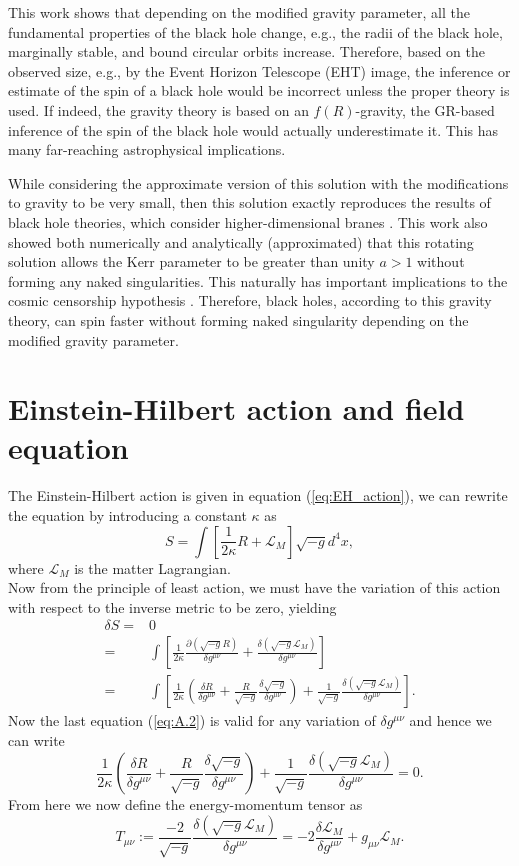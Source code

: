 \documentclass[12pt,a4paper,oneside]{book}
\newcommand{\eq}[2]{\begin{equation} \label{eq:#1} #2 \end{equation}}
\newcommand{\aeq}[2]{\begin{align} \label{eq:#1} #2 \end{align}}
\newcommand{\Eref}[1]{(\ref{eq:#1})}
\begin{document}
This work shows that depending on the modified gravity
parameter, all the fundamental properties of the black hole change, e.g., the 
radii of the black hole,
marginally stable, and bound circular orbits increase. Therefore, based on the
observed size, e.g., by the Event Horizon Telescope (EHT) image, the inference or
estimate of the spin of a black hole would be incorrect unless the proper theory is used.
If indeed, the gravity theory is based on an $f(R)$-gravity, the GR-based inference of the spin
of the black hole would actually underestimate it. This has many far-reaching
astrophysical implications.


While considering the approximate version of this solution with the modifications to gravity to be very small, then this solution exactly reproduces the results of black hole theories, which consider higher-dimensional branes \cite{Charged_BH_Brane, BH_Brane}. This work also showed both numerically and analytically (approximated) that this rotating solution allows the Kerr parameter to be greater than unity $a>1$ without forming any naked singularities. This naturally has important implications to the
cosmic censorship hypothesis \cite{1969NCimR...1..252P,2002GReGr..34.1141P}.
Therefore, black holes, according to this gravity theory, can spin faster without forming
naked singularity depending on the modified gravity parameter.

\appendix\label{Chap_Conclude}
\chapter{Einstein-Hilbert action and field equation}\label{A}
The Einstein-Hilbert action is given in equation \Eref{EH_action}, we can rewrite the equation by introducing a constant $\kappa$ as
\eq{}{S = \int \left[ \frac{1}{2\kappa}R + \mathcal{L}_M\right]\sqrt{-g}d^4x,}
where $\mathcal{L}_M$ is the matter Lagrangian.\\
Now from the principle of least action, we must have the variation of this action with respect to the inverse metric to be zero, yielding \cite{Sean,Misner_Thrones,M_Wald}
\aeq{A.2}{
\delta S =& 0\nonumber\\ 
=&\int\left[\frac{1}{2\kappa}\frac{\partial(\sqrt{-g}R)}{\delta g^{\mu\nu}}+\frac{\delta(\sqrt{-g}\mathcal{L}_M)}{\delta g^{\mu\nu}}\right]\nonumber\\
=&\int\left[\frac{1}{2\kappa}\left(\frac{\delta R}{\delta g^{\mu\nu}}+\frac{R}{\sqrt{-g}}\frac{\delta \sqrt{-g}}{\delta g^{\mu\nu}}\right)+\frac{1}{\sqrt{-g}}\frac{\delta(\sqrt{-g}\mathcal{L}_M)}{\delta g^{\mu\nu}}\right].
}
Now the last equation \Eref{A.2} is valid for any variation of $\delta g^{\mu\nu}$ and hence we can write
\eq{A.3}{\frac{1}{2\kappa}\left(\frac{\delta R}{\delta g^{\mu\nu}}+\frac{R}{\sqrt{-g}}\frac{\delta \sqrt{-g}}{\delta g^{\mu\nu}}\right)+\frac{1}{\sqrt{-g}}\frac{\delta(\sqrt{-g}\mathcal{L}_M)}{\delta g^{\mu\nu}}=0.}
From here we now define the energy-momentum tensor as
\eq{A.4}{T_{\mu\nu}:=\frac{-2}{\sqrt{-g}}\frac{\delta(\sqrt{-g}\mathcal{L}_M)}{\delta g^{\mu\nu}}=-2\frac{\delta \mathcal{L}_M}{\delta g^{\mu\nu}}+g_{\mu\nu}\mathcal{L}_M.}
\end{document}
